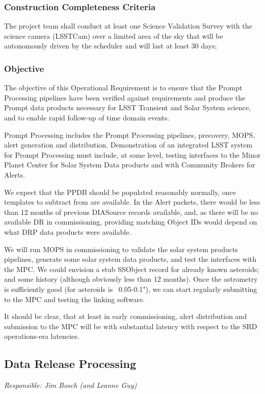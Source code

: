 \subsubsection{Construction Completeness Criteria}
The project team shall conduct at least one Science Validation Survey with the science camera (LSSTCam) over a limited area of the sky that will be autonomously driven by the scheduler and will last at least 30 days;

\subsubsection{Objective} 

The objective of this Operational Requirement is to ensure that the Prompt Processing pipelines have been verified against requirements and produce the Prompt data products necessary for LSST Transient and Solar System science, and to enable rapid follow-up of time domain events. 

Prompt Processing includes the Prompt Processing pipelines, precovery, MOPS, alert generation and distribution. Demonstration of an integrated LSST system for Prompt Processing must include, at some level, testing interfaces to the Minor Planet Center for Solar System Data products and with Community Brokers for Alerts. 

We expect that the PPDB should be populated reasonably normally, once templates to subtract from are available.  In the Alert packets, there would be less than 12 months of previous DIASource records available, and, as there will be no available DR in commissioning, providing matching Object IDs would depend on what DRP data products were available. 

We will run MOPS in commissioning to validate the solar system products pipelines, generate some solar system data products, and test the interfaces with the MPC. We could envision a stub SSObject record for already known asteroids; and some history (although obviously less than 12 months). Once the astrometry is sufficiently good (for asteroids is ~0.05-0.1"),  we can start regularly submitting to the MPC and testing the linking software. 

It should be clear, that at least in early commissioning, alert distribution and submission to the MPC  will be with substantial latency with respect to the SRD operations-era latencies.  



\subsection{Data Release Processing}
{\it Responsible: Jim Bosch (and Leanne Guy)}

